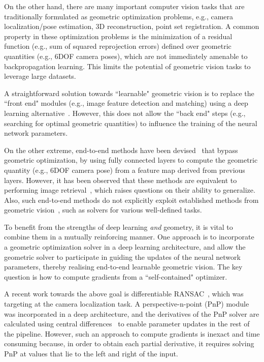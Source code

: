 \documentclass[10pt,twocolumn,letterpaper]{article}
\begin{document}
On the other hand, there are many important computer vision tasks that are traditionally formulated as geometric optimization problems, e.g., camera localization/pose estimation, 3D reconstruction, point set registration. A common property in these optimization problems is the minimization of a residual function (e.g., sum of squared reprojection errors) defined over geometric quantities (e.g., 6DOF camera poses), which are not immediately amenable to backpropagation learning. This limits the potential of geometric vision tasks to leverage large datasets.

A straightforward solution towards ``learnable" geometric vision is to replace the ``front end" modules (e.g., image feature detection and matching) using a deep learning alternative~\cite{Thewlis2016fully,Yi2016lift,Suwajanakorn2018discovery}. However, this does not allow the ``back end" steps (e.g., searching for optimal geometric quantities) to influence the training of the neural network parameters.

On the other extreme, end-to-end methods have been devised~\cite{kendall2015posenet,Kendall2016modelling,kendall2017geometric,brahmbhatt2018geometry,naseer2017deep,walch2017image,wu2017delving,Cai2018hybrid} that bypass geometric optimization, by using fully connected layers to compute the geometric quantity (e.g., 6DOF camera pose) from a feature map derived from previous layers. However, it has been observed that these methods are equivalent to performing image retrieval~\cite{Sattler2019understanding}, which raises questions on their ability to generalize. Also, such end-to-end methods do not explicitly exploit established methods from geometric vision~\cite{hartley2003multiple}, such as solvers for various well-defined tasks.

To benefit from the strengths of deep learning \emph{and} geometry, it is vital to combine them in a mutually reinforcing manner. One approach is to incorporate a geometric optimization solver in a deep learning architecture, and allow the geometric solver to participate in guiding the updates of the neural network parameters, thereby realising end-to-end learnable geometric vision. The key question is how to compute gradients from a ``self-contained" optimizer.

A recent work towards the above goal is differentiable RANSAC~\cite{Brachmann2017dsac, brachmann2019expert, brachmann2019neural}, which was targeting at the camera localization task. A perspective-n-point (PnP) module was incorporated in a deep architecture, and the derivatives of the PnP solver are calculated using central differences~\cite{richardson1954introduction} to enable parameter updates in the rest of the pipeline. However, such an approach to compute gradients is inexact and time consuming because, in order to obtain each partial derivative, it requires solving PnP at values that lie to the left and right of the input.
\end{document}
